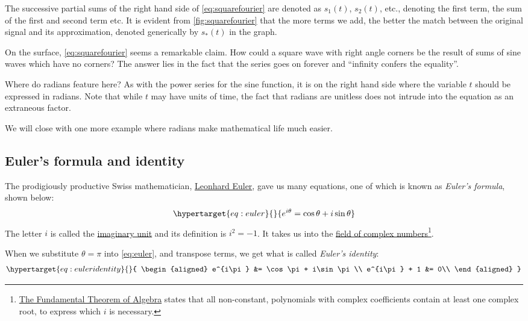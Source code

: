 \documentclass[
  a4paper,
]{article}
\begin{document}
The successive partial sums of the right hand side of
\cref{eq:squarefourier} are denoted as \(s_1(t)\), \(s_2(t)\), etc.,
denoting the first term, the sum of the first and second term etc. It is
evident from \cref{fig:squarefourier} that the more terms we add, the
better the match between the original signal and its approximation,
denoted generically by \(s_*(t)\) in the graph.

On the surface, \cref{eq:squarefourier} seems a remarkable claim. How
could a square wave with right angle corners be the result of sums of
sine waves which have no corners? The answer lies in the fact that the
series goes on forever and ``infinity confers the equality''.

Where do radians feature here? As with the power series for the sine
function, it is on the right hand side where the variable \(t\) should
be expressed in radians. Note that while \(t\) may have units of time,
the fact that radians are unitless does not intrude into the equation as
an extraneous factor.

We will close with one more example where radians make mathematical life
much easier.

\hypertarget{eulers-formula-and-identity}{%
\subsection{Euler's formula and
identity}\label{eulers-formula-and-identity}}

The prodigiously productive Swiss mathematician,
\href{https://www.britannica.com/biography/Leonhard-Euler}{Leonhard
Euler}, gave us many equations, one of which is known as \emph{Euler's
formula}, shown below: \begin{equation}\protect\hypertarget{eq:euler}{}{
e^{i\theta} = \cos\theta + i\sin\theta
}\label{eq:euler}\end{equation} The letter \(i\) is called the
\href{https://en.wikipedia.org/wiki/Imaginary_unit}{imaginary unit} and
its definition is \(i^{2} = -1\). It takes us into the
\href{https://en.wikipedia.org/wiki/Complex_number}{field of complex
numbers}\footnote{\href{https://en.wikipedia.org/wiki/Fundamental_theorem_of_algebra}{The
  Fundamental Theorem of Algebra} states that all non-constant,
  polynomials with complex coefficients contain at least one complex
  root, to express which \(i\) is necessary.}.

When we substitute \(\theta=\pi\) into \cref{eq:euler}, and transpose
terms, we get what is called \emph{Euler's identity}:
\begin{equation}\protect\hypertarget{eq:euleridentity}{}{
\begin{aligned}
e^{i\pi} &= \cos\pi + i\sin\pi\\
e^{i\pi} + 1 &= 0\\
\end{aligned}
}\label{eq:euleridentity}\end{equation}
\end{document}
